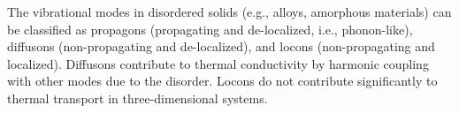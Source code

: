 \documentclass[aps,prb,twocolumn,superscriptaddress,footinbib,amsmath,amssymb,floatfix]{revtex4}
\begin{document}

The vibrational modes in disordered solids (e.g., alloys, 
amorphous materials) can be 
classified as propagons (propagating and de-localized, 
i.e., phonon-like), diffusons (non-propagating and 
de-localized), and locons (non-propagating and localized).
\cite{allen_thermal_1993,allen_diffusons_1999} 
Diffusons contribute to thermal conductivity by harmonic coupling 
with other modes due to the disorder. Locons do not contribute 
significantly to thermal transport in three-dimensional systems.
\cite{leitner_vibrational_2001}
\end{document}

